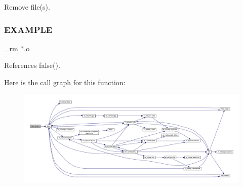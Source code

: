 Remove file(s). \subsubsection*{E\+X\+A\+M\+P\+LE}

\begin{DoxyVerb}  _rm *.o \end{DoxyVerb}
 

References false().

Here is the call graph for this function\+:
\nopagebreak
\begin{figure}[H]
\begin{center}
\leavevmode
\includegraphics[width=350pt]{__rm_8f90_a39c21619b08a3c22f19e2306efd7f766_cgraph}
\end{center}
\end{figure}
